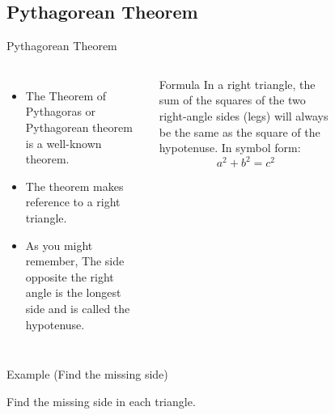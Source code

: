 \subsection{Pythagorean Theorem}
\begin{frame}[t]{Pythagorean Theorem}
    \begin{columns}[t]
        \begin{itemize}
            \item The Theorem of Pythagoras or Pythagorean theorem is a well-known theorem. 
            \item The theorem makes reference to a right triangle.
            \item As you might remember, The side opposite the right angle is the longest side and is called the hypotenuse.
        \end{itemize}
        \begin{block}{Formula}
            In a right triangle, the sum of the squares of the two right-angle sides (legs) will always be the same as the square of the hypotenuse. In symbol form:
            \[a^2+b^2 = c^2\]
        \end{block}
        \begin{figure}[H]
            \centering
        \end{figure}
    \end{columns}
\end{frame}
\begin{frame}[t]{Example (Find the missing side)}
    \begin{example}
        Find the missing side in each triangle.
        \begin{figure}[H]
            \centering
            
        \end{figure}
    \end{example}   
\end{frame}
